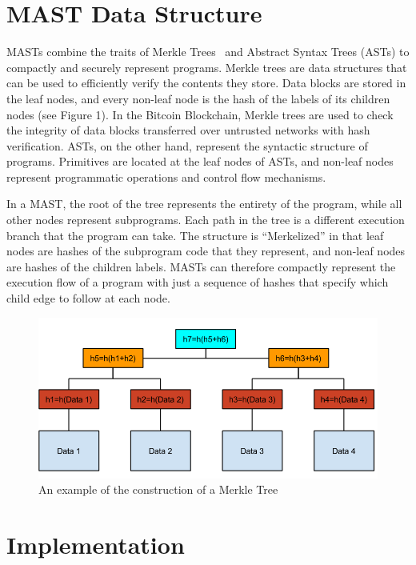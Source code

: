 \documentclass{vldb}
\begin{document}
\section{MAST Data Structure}

MASTs combine the traits of Merkle Trees~\cite{merkle} and Abstract Syntax Trees (ASTs) to compactly and securely represent programs. Merkle trees are data structures that can be used to efficiently verify the contents they store. Data blocks are stored in the leaf nodes, and every non-leaf node is the hash of the labels of its children nodes (see Figure 1). In the Bitcoin Blockchain, Merkle trees are used to check the integrity of data blocks transferred over untrusted networks with hash verification. ASTs, on the other hand, represent the syntactic structure of programs. Primitives are located at the leaf nodes of ASTs, and non-leaf nodes represent programmatic operations and control flow mechanisms.
 
In a MAST, the root of the tree represents the entirety of the program, while all other nodes represent subprograms. Each path in the tree is a different execution branch that the program can take. The structure is “Merkelized” in that leaf nodes are hashes of the subprogram code that they represent, and non-leaf nodes are hashes of the children labels. MASTs can therefore compactly represent the execution flow of a program with just a sequence of hashes that specify which child edge to follow at each node.

\begin{figure}[h]
	\includegraphics[scale=.4]{merkle_tree}
	\caption{An example of the construction of a Merkle Tree}
	\label{system}
\end{figure}

\section{Implementation}
\end{document}
